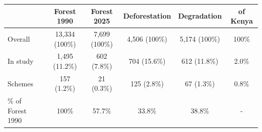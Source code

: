 
\begin{tabular}{lccccc}
\toprule
  & Forest 1990 & Forest 2025 & Deforestation & Degradation & of Kenya\\
\midrule
Overall & 13,334 (100\%) & 7,699 (100\%) & 4,506 (100\%) & 5,174 (100\%) & 100\%\\
\hspace{1em}In study & 1,495 (11.2\%) & 602 (7.8\%) & 704 (15.6\%) & 612 (11.8\%) & 2.0\%\\
\hspace{1em}Schemes & 157 (1.2\%) & 21 (0.3\%) & 125 (2.8\%) & 67 (1.3\%) & 0.8\%\\
\midrule
\% of Forest 1990 & 100\% & 57.7\% & 33.8\% & 38.8\% & -\\
\bottomrule
\end{tabular}